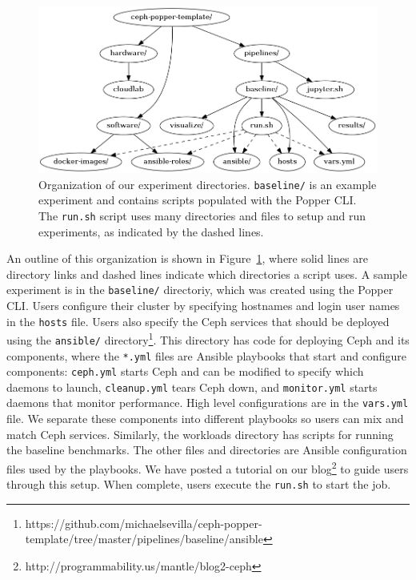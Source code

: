 \begin{figure}[tb] 
  \centering
  \includegraphics[width=1\linewidth]{./figures/expdir.png}
  \caption{Organization of our experiment directories. \texttt{baseline/} is an
example experiment and contains scripts populated with the Popper CLI. The
\texttt{run.sh} script uses many directories and files to setup and run
experiments, as indicated by the dashed lines.}
  \label{fig:expdir}
\end{figure}

An outline of this organization is shown in Figure~\ref{fig:expdir}, where
solid lines are directory links and dashed lines indicate which directories a
script uses.  A sample experiment is in the \texttt{baseline/} directoriy,
which was created using the Popper CLI. Users configure their cluster by
specifying hostnames and login user names in the \texttt{hosts} file.  Users
also specify the Ceph services that should be deployed using the
\texttt{ansible/}
directory\footnote{https://github.com/michaelsevilla/ceph-popper-template/tree/master/pipelines/baseline/ansible}.
This directory has code for deploying Ceph and its components, where the
\texttt{*.yml} files are Ansible playbooks that start and configure components:
\texttt{ceph.yml} starts Ceph and can be modified to specify which daemons to
launch, \texttt{cleanup.yml} tears Ceph down, and \texttt{monitor.yml} starts
daemons that monitor performance.  High level configurations are in the
\texttt{vars.yml} file.  We separate these components into different playbooks
so users can mix and match Ceph services.  Similarly, the workloads directory
has scripts for running the baseline benchmarks. The other files and
directories are Ansible configuration files used by the playbooks. We have
posted a tutorial on our
blog\footnote{http://programmability.us/mantle/blog2-ceph} to guide users
through this setup. When complete, users execute the \texttt{run.sh} to start
the job.

